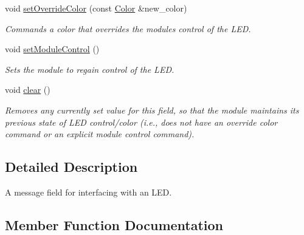 \begin{DoxyCompactItemize}
\mbox{\label{classhebi_1_1Command_1_1LedField_aa1c2fc432de51dba198988b5c285d6a4}} 
void \hyperlink{classhebi_1_1Command_1_1LedField_aa1c2fc432de51dba198988b5c285d6a4}{set\+Override\+Color} (const \hyperlink{structhebi_1_1Color}{Color} \&new\+\_\+color)
\begin{DoxyCompactList}\small\item\em Commands a color that overrides the module\textquotesingle{}s control of the L\+ED. \end{DoxyCompactList}\item 
\mbox{\label{classhebi_1_1Command_1_1LedField_a3f41b8c7cc1d1de4fe3d78683be62ef0}} 
void \hyperlink{classhebi_1_1Command_1_1LedField_a3f41b8c7cc1d1de4fe3d78683be62ef0}{set\+Module\+Control} ()
\begin{DoxyCompactList}\small\item\em Sets the module to regain control of the L\+ED. \end{DoxyCompactList}\item 
\mbox{\label{classhebi_1_1Command_1_1LedField_aa0e2f2c914e83e8b60ca9da40474dc15}} 
void \hyperlink{classhebi_1_1Command_1_1LedField_aa0e2f2c914e83e8b60ca9da40474dc15}{clear} ()
\begin{DoxyCompactList}\small\item\em Removes any currently set value for this field, so that the module maintains its previous state of L\+ED control/color (i.\+e., does not have an override color command or an explicit \textquotesingle{}module control\textquotesingle{} command). \end{DoxyCompactList}\end{DoxyCompactItemize}


\subsection{Detailed Description}
A message field for interfacing with an L\+ED. 

\subsection{Member Function Documentation}
\mbox{\label{classhebi_1_1Command_1_1LedField_aab7e6c19d8b4c5c5049789cd8690f2b0}} 

